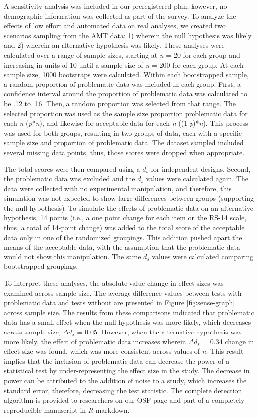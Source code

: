 \documentclass[english,man]{apa6}
\theoremstyle{definition}
\theoremstyle{definition}
\theoremstyle{definition}
\theoremstyle{remark}
\begin{document}
A sensitivity analysis was included in our preregistered plan; however,
no demographic information was collected as part of the survey. To
analyze the effects of low effort and automated data on real analyses,
we created two scenarios sampling from the AMT data: 1) wherein the null
hypothesis was likely and 2) wherein an alternative hypothesis was
likely. These analyses were calculated over a range of sample sizes,
starting at \emph{n} = 20 for each group and increasing in units of 10
until a sample size of \emph{n} = 200 for each group. At each sample
size, 1000 bootstraps were calculated. Within each bootstrapped sample,
a random proportion of problematic data was included in each group.
First, a confidence interval around the proportion of problematic data
was calculated to be .12 to .16. Then, a random proportion was selected
from that range. The selected proportion was used as the sample size
proportion problematic data for each \emph{n} (\emph{p}*\emph{n}), and
likewise for acceptable data for each \emph{n} ((1-\emph{p})*\emph{n}).
This process was used for both groups, resulting in two groups of data,
each with a specific sample size and proportion of problematic data. The
dataset sampled included several missing data points, thus, those scores
were dropped when appropriate.

The total scores were then compared using a \(d_s\) for independent
designs. Second, the problematic data was excluded and the \(d_s\)
values were calculated again. The data were collected with no
experimental manipulation, and therefore, this simulation was not
expected to show large differences between groups (supporting the null
hypothesis). To simulate the effects of problematic data on an
alternative hypothesis, 14 points (i.e., a one point change for each
item on the RS-14 scale, thus, a total of 14-point change) was added to
the total score of the acceptable data only in one of the randomized
groupings. This addition pushed apart the means of the acceptable data,
with the assumption that the problematic data would not show this
manipulation. The same \(d_s\) values were calculated comparing
bootstrapped groupings.

To interpret these analyses, the absolute value change in effect sizes
was examined across sample size. The average difference values between
tests with problematic data and tests without are presented in Figure
\ref{fig:sense-graph} across sample size. The results from these
comparisons indicated that problematic data has a small effect when the
null hypothesis was more likely, which decreases across sample size,
\(\Delta d_s\) = 0.05. However, when the alternative hypothesis was more
likely, the effect of problematic data increases wherein \(\Delta d_s\)
= 0.34 change in effect size was found, which was more consistent across
values of \emph{n}. This result implies that the inclusion of
problematic data can decrease the power of a statistical test by
under-representing the effect size in the study. The decrease in power
can be attributed to the addition of noise to a study, which increases
the standard error, therefore, decreasing the test statistic. The
complete detection algorithm is provided to researchers on our OSF page
and part of a completely reproducible manuscript in \emph{R} markdown.
\end{document}
